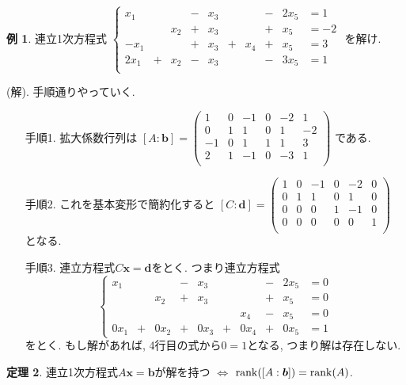\documentclass[dvipdfmx,a4paper,11pt]{article}
\theoremstyle{definition}
\newtheorem{thm}{定理}
\newtheorem{exa}[thm]{例}
\begin{document}
\begin{exa}
連立1次方程式
 $
 \left\{ 
\begin{matrix}
x_1& &  	&  - &x_3& & 	& -&2x_5	&= 1\\
	& & x_2& + &x_3& &	&+&x_5&= -2 \\
-x_1& &		& + &x_3&+& x_4&+& x_5&= 3 \\
2x_1&+&x_2& - &x_3& &	&-&3x_5&= 1\\
\end{matrix}
\right.
 $
 を解け.
 
 (解). 手順通りやっていく. 
  \begin{enumerate}
 	\setlength{\parskip}{0cm}
  	\setlength{\itemsep}{0pt} 
 \item[手順1.] 
  拡大係数行列は 
 $[A:\bm{b}]=
  \begin{pmatrix}
 1& 0& -1 & 0& -2& 1   \\
  0& 1& 1& 0& 1& -2   \\
 -1& 0& 1 & 1& 1& 3   \\
  2& 1& -1 & 0& -3& 1   \\
 \end{pmatrix}
 $
 である. 
  \item[手順2.] これを基本変形で簡約化すると
 $[C:\bm{d}] =
  \begin{pmatrix}
 1& 0& -1 & 0& -2& 0   \\
  0& 1& 1& 0& 1& 0  \\
 0& 0& 0 & 1& -1& 0   \\
  0& 0& 0 & 0& 0& 1   \\
 \end{pmatrix}
 $
 となる.
  \item[手順3.]  連立方程式$C\bm{x} =\bm{d}$をとく. つまり連立方程式
 $$
\left \{
 \begin{matrix}
x_1& &  & - &x_3 & & &-&2x_5&= 0 \\
      & &x_2&  +&x_3       && & +&x_5     &= 0\\
      & & &   &    & &		x_4& -& x_5&= 0 \\
0x_1&+&0x_2& + &0x_3&+&0x_4&+&0x_5&= 1       
\end{matrix}
\right.
 $$
 をとく. もし解があれば, 4行目の式から$0=1$となる, つまり解は存在しない.
\end{enumerate}
 

 \end{exa}


 
 
 \begin{tcolorbox}[
    colback = white,
    colframe = green!35!black,
    fonttitle = \bfseries,
    breakable = true]
    \begin{thm}
連立1次方程式$A\bm{x} =\bm{b}$が解を持つ
$\Leftrightarrow$ ${\rm rank}([A:\bm{b}]) = {\rm rank}(A)$.
  \end{thm}
 \end{tcolorbox}
\end{document}
